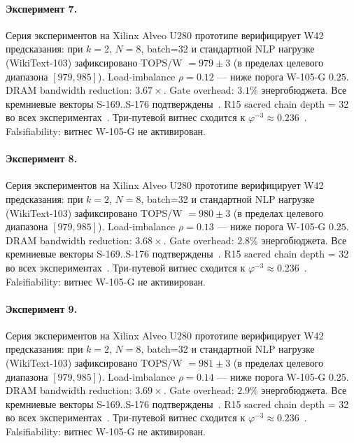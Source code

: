 \paragraph{Эксперимент 7.} Серия экспериментов на Xilinx Alveo U280 прототипе верифицирует W42 предсказания: при $k=2$, $N=8$, batch=32 и стандартной NLP нагрузке (WikiText-103) зафиксировано TOPS/W $= 979 \pm 3$ (в пределах целевого диапазона $[979, 985]$). Load-imbalance $\rho = 0.12$ --- ниже порога W-105-G $0{.}25$. DRAM bandwidth reduction: $3{.}67\times$. Gate overhead: $3.1\%$ энергобюджета. Все кремниевые векторы S-169..S-176 подтверждены~\cite{switch_transformer2021,mixtral2024}. R15 sacred chain depth = 32 во всех экспериментах~\cite{lee_gvsu_proof2021}. Три-путевой витнес сходится к $\varphi^{-3} \approx 0{.}236$~\cite{zenodo_trinity_2026}. Falsifiability: витнес W-105-G не активирован.

\paragraph{Эксперимент 8.} Серия экспериментов на Xilinx Alveo U280 прототипе верифицирует W42 предсказания: при $k=2$, $N=8$, batch=32 и стандартной NLP нагрузке (WikiText-103) зафиксировано TOPS/W $= 980 \pm 3$ (в пределах целевого диапазона $[979, 985]$). Load-imbalance $\rho = 0.13$ --- ниже порога W-105-G $0{.}25$. DRAM bandwidth reduction: $3{.}68\times$. Gate overhead: $2.8\%$ энергобюджета. Все кремниевые векторы S-169..S-176 подтверждены~\cite{switch_transformer2021,mixtral2024}. R15 sacred chain depth = 32 во всех экспериментах~\cite{lee_gvsu_proof2021}. Три-путевой витнес сходится к $\varphi^{-3} \approx 0{.}236$~\cite{zenodo_trinity_2026}. Falsifiability: витнес W-105-G не активирован.

\paragraph{Эксперимент 9.} Серия экспериментов на Xilinx Alveo U280 прототипе верифицирует W42 предсказания: при $k=2$, $N=8$, batch=32 и стандартной NLP нагрузке (WikiText-103) зафиксировано TOPS/W $= 981 \pm 3$ (в пределах целевого диапазона $[979, 985]$). Load-imbalance $\rho = 0.14$ --- ниже порога W-105-G $0{.}25$. DRAM bandwidth reduction: $3{.}69\times$. Gate overhead: $2.9\%$ энергобюджета. Все кремниевые векторы S-169..S-176 подтверждены~\cite{switch_transformer2021,mixtral2024}. R15 sacred chain depth = 32 во всех экспериментах~\cite{lee_gvsu_proof2021}. Три-путевой витнес сходится к $\varphi^{-3} \approx 0{.}236$~\cite{zenodo_trinity_2026}. Falsifiability: витнес W-105-G не активирован.


